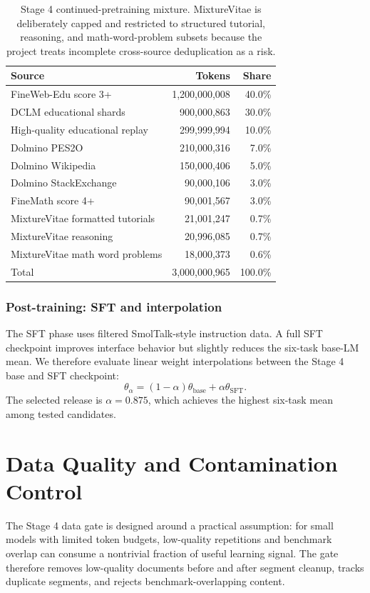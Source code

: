 \documentclass[11pt]{article}
\begin{document}
\begin{table}[h]
\centering
\small
\begin{tabularx}{\linewidth}{Y r r}
\toprule
Source & Tokens & Share \\
\midrule
FineWeb-Edu score 3+ & 1,200,000,008 & 40.0\% \\
DCLM educational shards & 900,000,863 & 30.0\% \\
High-quality educational replay & 299,999,994 & 10.0\% \\
Dolmino PES2O & 210,000,316 & 7.0\% \\
Dolmino Wikipedia & 150,000,406 & 5.0\% \\
Dolmino StackExchange & 90,000,106 & 3.0\% \\
FineMath score 4+ & 90,001,567 & 3.0\% \\
MixtureVitae formatted tutorials & 21,001,247 & 0.7\% \\
MixtureVitae reasoning & 20,996,085 & 0.7\% \\
MixtureVitae math word problems & 18,000,373 & 0.6\% \\
\midrule
Total & 3,000,000,965 & 100.0\% \\
\bottomrule
\end{tabularx}
\caption{Stage 4 continued-pretraining mixture. MixtureVitae is deliberately capped and restricted to structured tutorial, reasoning, and math-word-problem subsets because the project treats incomplete cross-source deduplication as a risk.}
\label{tab:stage4mix}
\end{table}

\subsubsection*{Post-training: SFT and interpolation}
The SFT phase uses filtered SmolTalk-style instruction data. A full SFT checkpoint improves interface behavior but slightly reduces the six-task base-LM mean. We therefore evaluate linear weight interpolations between the Stage 4 base and SFT checkpoint:
\[
  \theta_{\alpha} = (1-\alpha)\theta_{\mathrm{base}} + \alpha\theta_{\mathrm{SFT}}.
\]
The selected release is \(\alpha=0.875\), which achieves the highest six-task mean among tested candidates.

\section{Data Quality and Contamination Control}

The Stage 4 data gate is designed around a practical assumption: for small models with limited token budgets, low-quality repetitions and benchmark overlap can consume a nontrivial fraction of useful learning signal. The gate therefore removes low-quality documents before and after segment cleanup, tracks duplicate segments, and rejects benchmark-overlapping content.
\end{document}
